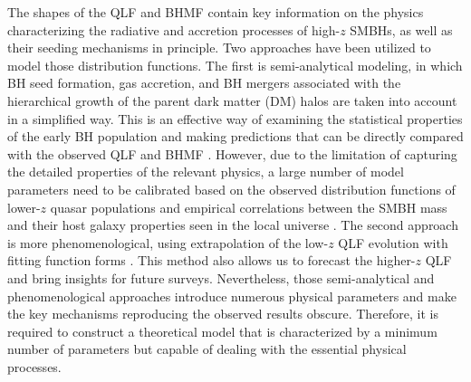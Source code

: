 \documentclass[twocolumn, twocolappendix]{aastex63}
\begin{document}
\begin{CJK*}{UTF8}{gbsn}
The shapes of the QLF and BHMF contain key information on the physics characterizing the radiative 
and accretion processes of high-$z$ SMBHs, as well as their seeding mechanisms in principle.
Two approaches have been utilized to model those distribution functions.  
The first is semi-analytical modeling, in which BH seed formation, gas accretion, and BH mergers associated 
with the hierarchical growth of the parent dark matter (DM) halos are taken into account in a simplified way. 
This is an effective way of examining the statistical properties of the early BH population and making predictions 
that can be directly compared with the observed QLF and BHMF
\citep[e.g.,][]{1998ApJ...503..505H,2010ApJ...718..231S,2018MNRAS.474.1995R,2018MNRAS.481.3278R,
2021MNRAS.508.2706Y,2021ApJ...910L..11K,2022MNRAS.511..616T}. 
However, due to the limitation of capturing the detailed properties of the relevant physics, 
a large number of model parameters need to be calibrated based on the observed distribution functions 
of lower-$z$ quasar populations \citep[e.g.,][]{2007ApJ...669...45H}
and empirical correlations between the SMBH mass and their host galaxy properties seen
in the local universe \citep{2013ARA&A..51..511K}.
The second approach is more phenomenological, using extrapolation of the low-$z$ QLF evolution with 
fitting function forms \citep[e.g.,][]{2019MNRAS.488.1035K,2020MNRAS.495.3252S,2022arXiv220702233F}.
This method also allows us to forecast the higher-$z$ QLF and bring insights for future surveys.
Nevertheless, those semi-analytical and phenomenological approaches introduce numerous physical parameters
and make the key mechanisms reproducing the observed results obscure.
Therefore, it is required to construct a theoretical model that is characterized by a minimum number of parameters
but capable of dealing with the essential physical processes.



\end{CJK*}
\end{document}
